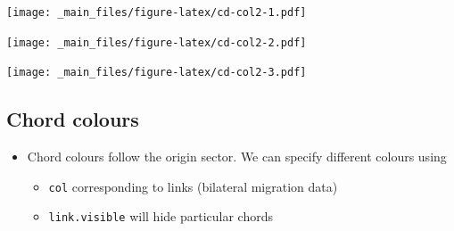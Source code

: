 \documentclass[
]{book}
\newenvironment{Shaded}{\begin{snugshade}}{\end{snugshade}}
\newcommand{\AttributeTok}[1]{\textcolor[rgb]{0.77,0.63,0.00}{#1}}
\newcommand{\FloatTok}[1]{\textcolor[rgb]{0.00,0.00,0.81}{#1}}
\newcommand{\FunctionTok}[1]{\textcolor[rgb]{0.00,0.00,0.00}{#1}}
\newcommand{\NormalTok}[1]{#1}
\newcommand{\SpecialCharTok}[1]{\textcolor[rgb]{0.00,0.00,0.00}{#1}}
\providecommand{\tightlist}{%
  \setlength{\itemsep}{0pt}\setlength{\parskip}{0pt}}
\begin{document}
\begin{Shaded}
\end{Shaded}

\texttt{[image: \_main\_files/figure-latex/cd-col2-1.pdf]}

\begin{Shaded}
\end{Shaded}

\texttt{[image: \_main\_files/figure-latex/cd-col2-2.pdf]}

\begin{Shaded}
\end{Shaded}

\texttt{[image: \_main\_files/figure-latex/cd-col2-3.pdf]}

\hypertarget{chord-colours}{%
\subsection{Chord colours}\label{chord-colours}}

\begin{itemize}
\tightlist
\item
  Chord colours follow the origin sector. We can specify different colours using

  \begin{itemize}
  \tightlist
  \item
    \texttt{col} corresponding to links (bilateral migration data)
  \item
    \texttt{link.visible} will hide particular chords
  \end{itemize}
\end{itemize}
\end{document}

